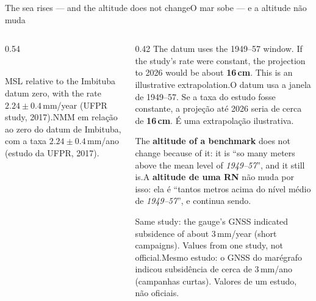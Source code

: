 \documentclass[aspectratio=169,11pt]{beamer}
\newcommand{\tr}[2]{\ifEN#2\else#1\fi}
\newcommand{\bnum}[1]{\ifmmode\textcolor{mTeal}{\mathbf{#1}}\else\textbf{\textcolor{mTeal}{#1}}\fi}
\begin{document}
\begin{frame}{\tr{O mar sobe --- e a altitude não muda}{The sea rises --- and the altitude does
not change}}
  \begin{columns}[T]
    \begin{column}{0.54\textwidth}
      \centering
      \\[1pt]
      {\scriptsize\tr{NMM em relação ao zero do datum de Imbituba, com a taxa
      $\num{2.24}\pm\num{0.4}$\,mm/ano (estudo da UFPR, 2017).}{MSL relative to the Imbituba datum
      zero, with the rate $\num{2.24}\pm\num{0.4}$\,mm/year (UFPR study, 2017).}}
    \end{column}
    \begin{column}{0.42\textwidth}
      \small
      \tr{O datum usa a janela de 1949--57. Se a taxa do estudo fosse constante,
      a projeção até 2026 seria de cerca de \bnum{\num{16}\,cm}.
      É uma extrapolação ilustrativa.}{The datum uses the 1949--57 window. If the study's
      rate were constant, the projection to 2026 would be about \bnum{\num{16}\,cm}.
      This is an illustrative extrapolation.}
      \medskip

      \tr{A \textbf{altitude de uma RN} não muda por isso: ela é ``tantos metros acima do
      nível médio de \emph{1949--57}'', e continua sendo.}{The \textbf{altitude of a benchmark}
      does not change because of it: it is ``so many meters above the mean level of
      \emph{1949--57}'', and it still is.}
      \medskip

      {\scriptsize\tr{Mesmo estudo: o GNSS do marégrafo indicou subsidência de cerca de
      \num{3}\,mm/ano (campanhas curtas). Valores de um estudo, não oficiais.}{Same study: the
      gauge's GNSS indicated subsidence of about \num{3}\,mm/year (short campaigns). Values from
      one study, not official.}}
    \end{column}
  \end{columns}
\end{frame}
\end{document}
